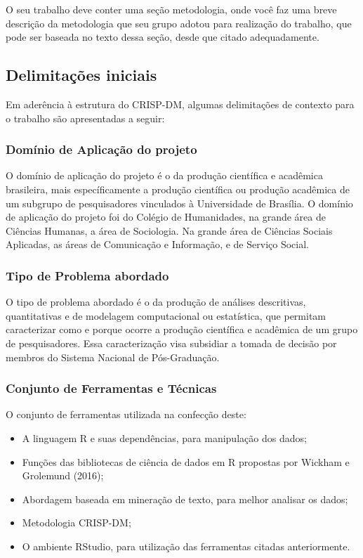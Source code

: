 \documentclass[]{article}
\providecommand{\tightlist}{%
  \setlength{\itemsep}{0pt}\setlength{\parskip}{0pt}}
\begin{document}
O seu trabalho deve conter uma seção metodologia, onde você faz uma
breve descrição da metodologia que seu grupo adotou para realização do
trabalho, que pode ser baseada no texto dessa seção, desde que citado
adequadamente.

\subsection{Delimitações iniciais}\label{delimitacoes-iniciais}

Em aderência à estrutura do CRISP-DM, algumas delimitações de contexto
para o trabalho são apresentadas a seguir:

\subsubsection{Domínio de Aplicação do
projeto}\label{dominio-de-aplicacao-do-projeto}

O domínio de aplicação do projeto é o da produção científica e acadêmica
brasileira, mais específicamente a produção científica ou produção
acadêmica de um subgrupo de pesquisadores vinculados à Universidade de
Brasília. O domínio de aplicação do projeto foi do Colégio de
Humanidades, na grande área de Ciências Humanas, a área de Sociologia.
Na grande área de Ciências Sociais Aplicadas, as áreas de Comunicação e
Informação, e de Serviço Social.

\subsubsection{Tipo de Problema
abordado}\label{tipo-de-problema-abordado}

O tipo de problema abordado é o da produção de análises descritivas,
quantitativas e de modelagem computacional ou estatística, que permitam
caracterizar como e porque ocorre a produção científica e acadêmica de
um grupo de pesquisadores. Essa caracterização visa subsidiar a tomada
de decisão por membros do Sistema Nacional de Pós-Graduação.

\subsubsection{Conjunto de Ferramentas e
Técnicas}\label{conjunto-de-ferramentas-e-tecnicas}

O conjunto de ferramentas utilizada na confecção deste:

\begin{itemize}
\tightlist
\item
  A linguagem R e suas dependências, para manipulação dos dados;
\item
  Funções das bibliotecas de ciência de dados em R propostas por Wickham
  e Grolemund (2016);
\item
  Abordagem baseada em mineração de texto, para melhor analisar os
  dados;
\item
  Metodologia CRISP-DM;
\item
  O ambiente RStudio, para utilização das ferramentas citadas
  anteriormente.
\end{itemize}
\end{document}

